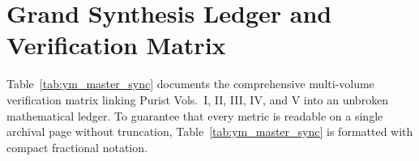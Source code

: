 \documentclass[11pt,a4paper,reqno]{article}
\theoremstyle{plain}
\theoremstyle{definition}
\theoremstyle{remark}
\numberwithin{equation}{section}
\begin{document}
\FloatBarrier
\clearpage

\section{Grand Synthesis Ledger and Verification Matrix}
\label{sec:conclusion_ym}

Table~\ref{tab:ym_master_sync} documents the comprehensive multi-volume verification matrix linking Purist Vols.~I, II, III, IV, and V into an unbroken mathematical ledger. To guarantee that every metric is readable on a single archival page without truncation, Table~\ref{tab:ym_master_sync} is formatted with compact fractional notation.
\end{document}
